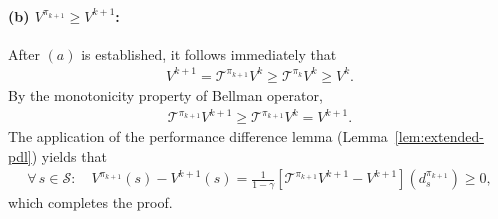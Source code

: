 \documentclass[10pt]{article}
\newcommand{\calS}{\mathcal{S}}
\newcommand{\calT}{\mathcal{T}}
\newcommand{\ls}{\left}
\newcommand{\rs}{\right}
\theoremstyle{plain}
\theoremstyle{definition}
\begin{document}
\paragraph{(b) $V^{\pi_{k+1}} \geq V^{k+1}$:} After $(a)$ is established, it follows immediately that
\begin{align*}
    V^{k+1} = \calT^{\pi_{k+1}}V^k \geq \calT^{\pi_k}V^k \geq V^k.
\end{align*}
By the monotonicity property of Bellman operator,
\begin{align*}
    \calT^{\pi_{k+1}}V^{k+1} \geq \calT^{\pi_{k+1}} V^k = V^{k+1}.
\end{align*}
The application of the performance difference lemma (Lemma~\ref{lem:extended-pdl}) yields that
\begin{align*}
    \forall\, s\in\calS: \quad V^{\pi_{k+1}}(s) - V^{k+1}(s) = \frac{1}{1-\gamma} \ls[ \calT^{\pi_{k+1}}V^{k+1} - V^{k+1} \rs](d^{\pi_{k+1}}_{s}) \geq 0,
\end{align*}
which completes the proof.
\end{document}
